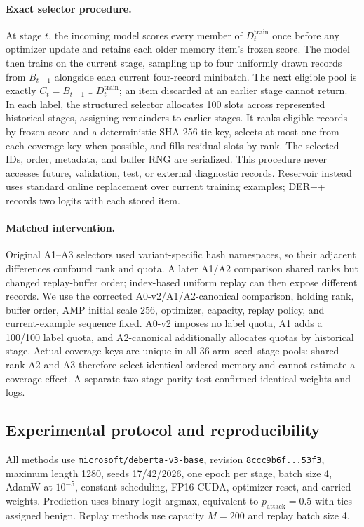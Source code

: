 \documentclass[conference]{IEEEtran}
\begin{document}
\paragraph{Exact selector procedure.}
At stage $t$, the incoming model scores every member of $D_t^{\mathrm{train}}$ once before any optimizer update and retains each older memory item's frozen score. The model then trains on the current stage, sampling up to four uniformly drawn records from $B_{t-1}$ alongside each current four-record minibatch. The next eligible pool is exactly $C_t=B_{t-1}\cup D_t^{\mathrm{train}}$; an item discarded at an earlier stage cannot return. In each label, the structured selector allocates 100 slots across represented historical stages, assigning remainders to earlier stages. It ranks eligible records by frozen score and a deterministic SHA-256 tie key, selects at most one from each coverage key when possible, and fills residual slots by rank. The selected IDs, order, metadata, and buffer RNG are serialized. This procedure never accesses future, validation, test, or external diagnostic records. Reservoir instead uses standard online replacement over current training examples; DER++ records two logits with each stored item.

\paragraph{Matched intervention.}
Original A1--A3 selectors used variant-specific hash namespaces, so their adjacent differences confound rank and quota. A later A1/A2 comparison shared ranks but changed replay-buffer order; index-based uniform replay can then expose different records. We use the corrected A0-v2/A1/A2-canonical comparison, holding rank, buffer order, AMP initial scale 256, optimizer, capacity, replay policy, and current-example sequence fixed. A0-v2 imposes no label quota, A1 adds a 100/100 label quota, and A2-canonical additionally allocates quotas by historical stage. Actual coverage keys are unique in all 36 arm--seed--stage pools: shared-rank A2 and A3 therefore select identical ordered memory and cannot estimate a coverage effect. A separate two-stage parity test confirmed identical weights and logs.
\subsection{Experimental protocol and reproducibility}
All methods use \texttt{microsoft/deberta-v3-base}, revision \texttt{8ccc9b6f...53f3}, maximum length 1280, seeds 17/42/2026, one epoch per stage, batch size 4, AdamW at $10^{-5}$, constant scheduling, FP16 CUDA, optimizer reset, and carried weights. Prediction uses binary-logit argmax, equivalent to $p_{\mathrm{attack}}=0.5$ with ties assigned benign. Replay methods use capacity $M=200$ and replay batch size 4.
\end{document}
